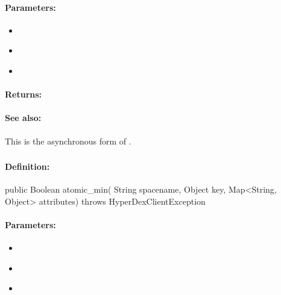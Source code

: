 \paragraph{Parameters:}
\begin{itemize}[noitemsep]
\item {}\\

\item {}\\

\item {}\\

\end{itemize}

\paragraph{Returns:}


\paragraph{See also:}  This is the asynchronous form of .

\pagebreak
\subsubsection{}
\label{api:java:atomic_min}


\paragraph{Definition:}
\begin{javacode}
public Boolean atomic_min(
        String spacename,
        Object key,
        Map<String, Object> attributes) throws HyperDexClientException
\end{javacode}

\paragraph{Parameters:}
\begin{itemize}[noitemsep]
\item {}\\

\item {}\\

\item {}\\

\end{itemize}

